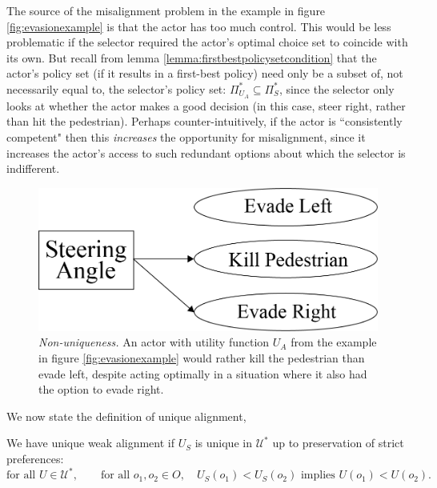 \begin{intuition*}
	\textnormal{The source of the misalignment problem in the example in figure \ref{fig:evasionexample} is that the actor has too much control. This would be less problematic if the selector required the actor's optimal choice set to coincide with its own. But recall from lemma \ref{lemma:firstbestpolicysetcondition} that the actor's policy set (if it results in a first-best policy) need only be a subset of, not necessarily equal to, the selector's policy set: $\Pi^*_{U_A}\subseteq \Pi_S^*$, since the selector only looks at whether the actor makes a good decision (in this case, steer right, rather than hit the pedestrian). Perhaps counter-intuitively, if the actor is ``consistently competent" then this \textit{increases} the opportunity for misalignment, since it increases the actor's access to such redundant options about which the selector is indifferent. } 
\end{intuition*}


\begin{figure}[H]
	\centering
	\captionsetup{labelfont=bf,font=small,labelsep=period}
	\includegraphics[width=0.4\linewidth]{"images/theorem-examples/evasionexample2"}
	\caption{\rightskip=20pt\leftskip=20pt \textit{Non-uniqueness.} An actor with utility function $U_A$ from the example in figure \ref{fig:evasionexample} would rather kill the pedestrian than evade left, despite acting optimally in a situation where it also had the option to evade right.
	}
	\label{fig:evasionexample2} 	
\end{figure}



We now state the definition of unique alignment,

\begin{definition}
	We have unique weak alignment if $U_S$ is unique in $\mathcal U^*$ up to preservation of strict preferences: 
	\[\text{for all }U\in\mathcal U^*,\quad \quad \text{for all } o_1,o_2\in O, \quad U_S(o_1)<U_S(o_2) \text{ implies }  U(o_1)<U(o_2).\]
\end{definition}


